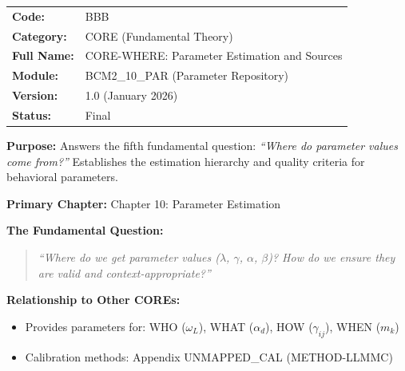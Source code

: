 %
%
%

\begin{tcolorbox}[colback=gray!5!white, colframe=gray!75!black,
    title=Appendix Header: BBB CORE-WHERE]

\begin{tabular}{@{}ll@{}}
\textbf{Code:} & BBB \\
\textbf{Category:} & CORE (Fundamental Theory) \\
\textbf{Full Name:} & CORE-WHERE: Parameter Estimation and Sources \\
\textbf{Module:} & BCM2\_10\_PAR (Parameter Repository) \\
\textbf{Version:} & 1.0 (January 2026) \\
\textbf{Status:} & Final \\
\end{tabular}

\vspace{0.5em}
\textbf{Purpose:} Answers the fifth fundamental question:
\textit{``Where do parameter values come from?''}
Establishes the estimation hierarchy and quality criteria for behavioral parameters.

\end{tcolorbox}

\begin{tcolorbox}[colback=purple!5!white, colframe=purple!75!black,
    title=Chapter Linkage]

\textbf{Primary Chapter:} Chapter 10: Parameter Estimation

\textbf{The Fundamental Question:}
\begin{quote}
\textit{``Where do we get parameter values ($\lambda$, $\gamma$, $\alpha$, $\beta$)?
How do we ensure they are valid and context-appropriate?''}
\end{quote}

\textbf{Relationship to Other COREs:}
\begin{itemize}[nosep]
\item Provides parameters for: WHO ($\omega_L$), WHAT ($\alpha_d$), HOW ($\gamma_{ij}$), WHEN ($m_k$)
\item Calibration methods: Appendix UNMAPPED_CAL (METHOD-LLMMC)
\end{itemize}

\end{tcolorbox}

